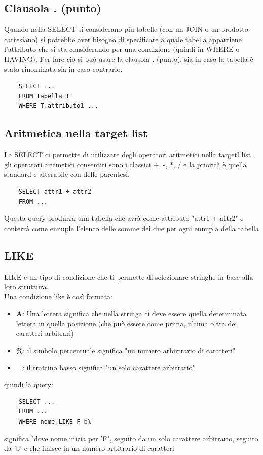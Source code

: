 \documentclass[12pt, a4paper, openany]{book}
\begin{document}
\subsection*{Clausola . (punto)}
Quando nella SELECT si considerano più tabelle (con un JOIN o un prodotto cartesiano) si potrebbe aver bisogno di specificare a quale tabella appartiene l'attributo che si sta considerando per una condizione (quindi in WHERE o HAVING).
Per fare ciò si può usare la clausola \textbf{.} (punto), sia in caso la tabella è stata rinominata sia in caso contrario.

\begin{verbatim}
    SELECT ...
    FROM tabella T
    WHERE T.attributo1 ...
\end{verbatim}

\subsection*{Aritmetica nella target list}
La SELECT ci permette di utilizzare degli operatori aritmetici nella targetl list.\\
gli operatori aritmetici consentiti sono i classici +, -, *, / e la priorità è quella standard e alterabile con delle parentesi.
\begin{verbatim}
    SELECT attr1 + attr2
    FROM ...
\end{verbatim}
Questa query produrrà una tabella che avrà come attributo "attr1 + attr2" e conterrà come ennuple l'elenco delle somme dei due per ogni ennupla della tabella  

\subsection*{LIKE} 
LIKE è un tipo di condizione che ti permette di selezionare stringhe in base alla loro struttura.\\
Una condizione like è così formata:
\begin{itemize}
    \item \textbf{A}: Una lettera significa che nella stringa ci deve essere quella determinata lettera in quella posizione (che può essere come prima, ultima o tra dei caratteri arbitrari)
    \item \textbf{\%}: il simbolo percentuale significa "un numero arbirtrario di caratteri"
    \item \textbf{\_}: il trattino basso significa "un solo carattere arbitrario"
\end{itemize}
quindi la query:
\begin{verbatim}
    SELECT ...
    FROM ...
    WHERE nome LIKE F_b%
\end{verbatim}
significa "dove nome inizia per 'F", seguito da un solo carattere arbitrario, seguito da 'b' e che finisce in un numero arbitrario di caratteri
\end{document}
